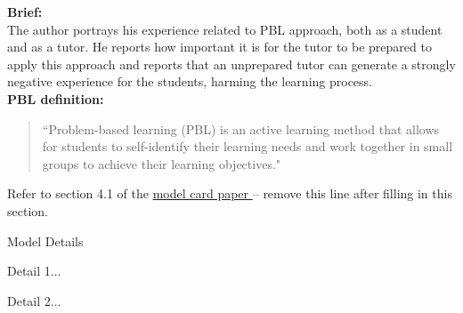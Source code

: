 \documentclass{article}
\begin{document}
\begin{adjustwidth}{-60pt}{-30pt}
\begin{singlespace}


\begin{minipage}{1.26\textwidth}

\begin{pabox}[label={myusecounter}]{\hfill  \cite{Fernandes2021}}

\textbf{Brief:} \\

The author portrays his experience related to PBL approach, both as a student and as a tutor. He reports how important it is for the tutor to be prepared to apply this approach and reports that an unprepared tutor can generate a strongly negative experience for the students, harming the learning process.\\

\textbf{PBL definition:}
\begin{quote}
 ``Problem-based learning (PBL) is an active learning method that allows for students to self-identify their learning needs and work together in small groups to achieve their learning objectives."
\end{quote} 

\tcblower




\end{pabox}
\end{minipage}

\begin{tcolorbox}[title=\textbf{Model Card - CheXNet},
    breakable, sharp corners, boxrule=0.7pt]

\small{

Refer to section 4.1 of the \href{https://arxiv.org/abs/1810.03993}{model card paper } -- remove this line after filling in this section.

\begin{mcsection}{Model Details}
    \item Detail 1...
    \item Detail 2...
\end{mcsection}

}
\end{tcolorbox}
\end{singlespace}
\end{adjustwidth}
\end{document}

